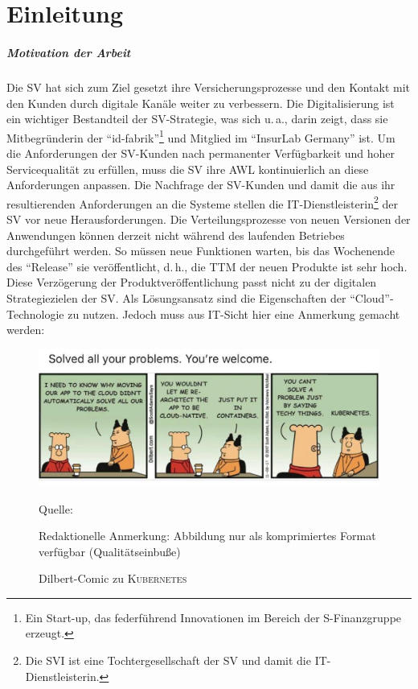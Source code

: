 \acresetall 

\chapter{Einleitung}\label{kap:einleitung}
\paragraph{Motivation der Arbeit}
Die \ac{SV} hat sich zum Ziel gesetzt ihre Versicherungsprozesse und den Kontakt mit den Kunden durch digitale Kanäle weiter zu verbessern. Die Digitalisierung ist ein wichtiger Bestandteil der \ac{SV}-Strategie, was sich u.\,a., darin zeigt, dass sie Mitbegründerin der \enquote{id-fabrik}\footnote{Ein Start-up, das federführend Innovationen im Bereich der S-Finanzgruppe erzeugt.} und Mitglied im \enquote{InsurLab Germany}\autocite[vgl.][S.\,30]{sv_sparkassenversicherung_sv_2019} ist. Um die Anforderungen der \ac{SV}-Kunden nach permanenter Verfügbarkeit und hoher Servicequalität zu erfüllen, muss die \ac{SV} ihre \ac{AWL} kontinuierlich an diese Anforderungen anpassen. Die Nachfrage der \ac{SV}-Kunden und damit die aus ihr resultierenden Anforderungen an die Systeme stellen die IT-Dienstleisterin\footnote{Die \ac{SVI} ist eine Tochtergesellschaft der \ac{SV} und damit die IT-Dienstleisterin.} der \ac{SV} vor neue Herausforderungen. Die Verteilungsprozesse von neuen Versionen der Anwendungen können derzeit nicht während des laufenden Betriebes durchgeführt werden. So müssen neue Funktionen warten, bis das Wochenende des \enquote{Release} sie veröffentlicht, d.\,h., die \ac{TTM} der neuen Produkte ist sehr hoch. Diese Verzögerung der Produktveröffentlichung passt nicht zu der digitalen Strategiezielen der \ac{SV}. Als Lösungsansatz sind die Eigenschaften der \enquote{Cloud}-Technologie zu nutzen. Jedoch muss aus IT-Sicht hier eine Anmerkung gemacht werden:

\begin{figure}[h!]
	\centering
	\includegraphics[scale=0.33]{img/dilbertCloud.jpeg}
	\caption{Dilbert-Comic zu \textsc{Kubernetes}}
	\label{abb:dilbertK8s}
	{\footnotesize Quelle: \cite{DilbertKubernetes}\par}
	{\footnotesize Redaktionelle Anmerkung: Abbildung nur als komprimiertes Format verfügbar (Qualitätseinbuße)}
\end{figure}

